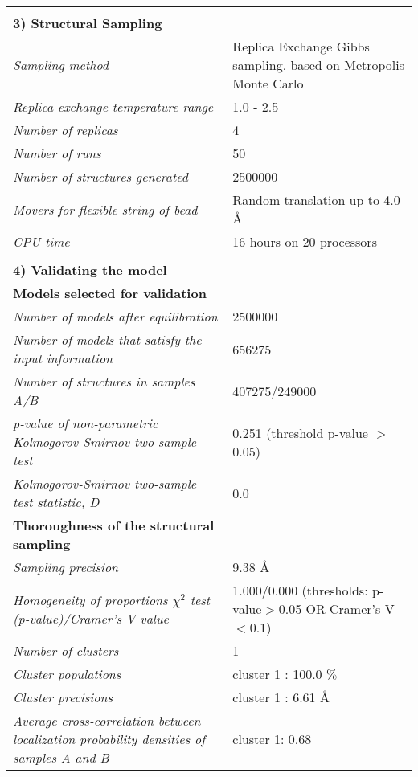 \documentclass[8pt,a4paper]{article}
\begin{document}
\begin{longtable}{ p{} | p{} }
   &  \\
    \normalsize{\textbf{3) Structural Sampling}} & \\
    \hline
            \textit{Sampling method} & Replica Exchange Gibbs sampling, based on Metropolis Monte Carlo\\
                \textit{Replica exchange temperature range} & 1.0 - 2.5\\
                \textit{Number of replicas} & 4\\
                \textit{Number of runs} & 50\\
                \textit{Number of structures generated} & 2500000\\
                \textit{Movers for flexible string of bead} & Random translation up to 4.0 \AA\\
                \textit{CPU time} & 16 hours on 20 processors\\
        
   &  \\
  \normalsize{\textbf{4) Validating the model}} & \\
    \hline
   \textbf{Models selected for validation} & \\
    \hline
          \textit{Number of models after equilibration} & 2500000\\
                \textit{Number of models that satisfy the input information} & 656275\\
                \textit{Number of structures in samples A/B} & 407275/249000\\
                \textit{p-value of non-parametric Kolmogorov-Smirnov two-sample test} & 0.251 (threshold p-value $>$ 0.05)\\
                \textit{Kolmogorov-Smirnov two-sample test statistic, D} & 0.0\\
           \hline
    
    \textbf{Thoroughness of the structural sampling} & \\
    \hline
          \textit{Sampling precision} & 9.38 \AA \\
                \textit{Homogeneity of proportions $\chi^2$ test (p-value)/Cramer’s V value} & 1.000/0.000 (thresholds: p-value$>$0.05 OR Cramer's V$<$0.1)\\
                \textit{Number of clusters} & 1\\
                \textit{Cluster populations} & cluster 1 : 100.0 $\%$\\
                \textit{Cluster precisions} & cluster 1 : 6.61 \AA\\
                \textit{Average cross-correlation between localization probability densities of samples A and B} & cluster 1: 0.68\\
           \hline
  

\end{longtable}
\end{document}
